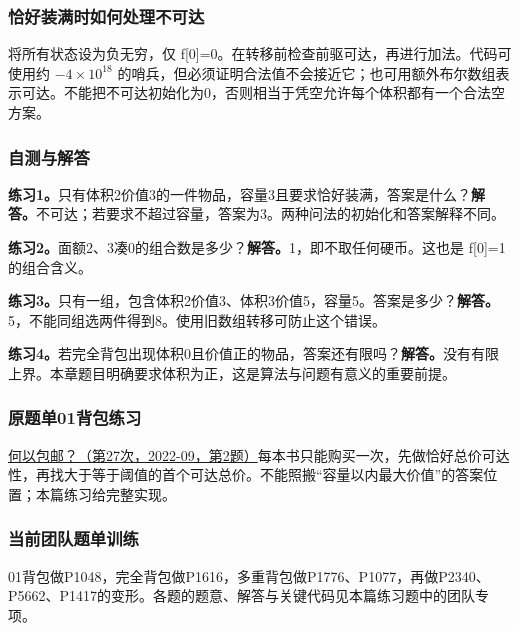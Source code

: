 \subsubsection{恰好装满时如何处理不可达}
将所有状态设为负无穷，仅 f[0]=0。在转移前检查前驱可达，再进行加法。代码可使用约 $-4\times10^{18}$ 的哨兵，但必须证明合法值不会接近它；也可用额外布尔数组表示可达。不能把不可达初始化为0，否则相当于凭空允许每个体积都有一个合法空方案。

\subsubsection{自测与解答}
\textbf{练习1。}只有体积2价值3的一件物品，容量3且要求恰好装满，答案是什么？\textbf{解答。}不可达；若要求不超过容量，答案为3。两种问法的初始化和答案解释不同。

\textbf{练习2。}面额2、3凑0的组合数是多少？\textbf{解答。}1，即不取任何硬币。这也是 f[0]=1 的组合含义。

\textbf{练习3。}只有一组，包含体积2价值3、体积3价值5，容量5。答案是多少？\textbf{解答。}5，不能同组选两件得到8。使用旧数组转移可防止这个错误。

\textbf{练习4。}若完全背包出现体积0且价值正的物品，答案还有限吗？\textbf{解答。}没有有限上界。本章题目明确要求体积为正，这是算法与问题有意义的重要前提。
\newpage
\subsubsection{原题单01背包练习}
\href{https://www.acwing.com/problem/content/4703/}{何以包邮？（第27次，2022-09，第2题）}每本书只能购买一次，先做恰好总价可达性，再找大于等于阈值的首个可达总价。不能照搬“容量以内最大价值”的答案位置；本篇练习给完整实现。

\subsubsection{当前团队题单训练}
01背包做P1048，完全背包做P1616，多重背包做P1776、P1077，再做P2340、P5662、P1417的变形。各题的题意、解答与关键代码见本篇练习题中的团队专项。
